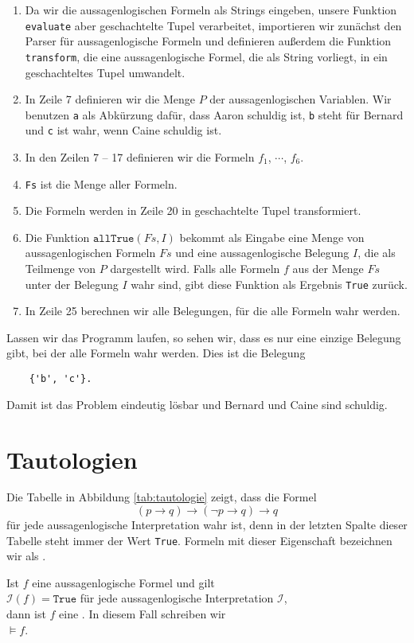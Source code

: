 \begin{enumerate}
\item Da wir die aussagenlogischen Formeln als Strings eingeben, unsere Funktion \texttt{evaluate} aber
      geschachtelte Tupel verarbeitet, importieren wir zunächst den Parser für aussagenlogische Formeln
      und definieren außerdem die Funktion \texttt{transform}, die eine aussagenlogische Formel, die als
      String vorliegt, in ein geschachteltes Tupel umwandelt.
\item In Zeile 7 definieren wir die Menge $P$ der aussagenlogischen Variablen.  Wir benutzen \texttt{a} als
      Abkürzung dafür, dass Aaron schuldig ist, \texttt{b} steht für Bernard und \texttt{c} ist wahr, wenn
      Caine schuldig ist. 
\item In den Zeilen 7 -- 17 definieren wir die Formeln $f_1$, $\cdots$, $f_6$.
\item \texttt{Fs} ist die Menge aller Formeln.
\item Die Formeln werden in Zeile 20 in geschachtelte Tupel transformiert.
\item Die Funktion $\texttt{allTrue}(Fs, I)$ bekommt als Eingabe eine Menge von aussagenlogischen Formeln $Fs$
      und eine aussagenlogische Belegung $I$, die als Teilmenge von $P$ dargestellt wird.  Falls alle Formeln
      $f$ aus der Menge $Fs$ unter der Belegung $I$ wahr sind, gibt diese Funktion als Ergebnis \texttt{True} zurück.
\item In Zeile 25 berechnen wir alle Belegungen, für die alle Formeln wahr werden.
\end{enumerate}
Lassen wir das Programm laufen, so sehen wir, dass es nur eine einzige Belegung gibt, bei der alle Formeln wahr
werden.  Dies ist die Belegung
\begin{verbatim}
    {'b', 'c'}.
\end{verbatim}
Damit ist das Problem eindeutig lösbar und Bernard und Caine sind schuldig.


\section{Tautologien}
Die Tabelle in Abbildung \ref{tab:tautologie} zeigt, dass die Formel
$$  (p \rightarrow q) \rightarrow (\neg p \rightarrow q) \rightarrow q $$
für jede aussagenlogische Interpretation wahr ist, denn in der letzten Spalte dieser Tabelle steht immer der
Wert \texttt{True}.  Formeln mit dieser Eigenschaft  bezeichnen wir als .
\begin{Definition}[Tautologie]
  Ist $f$ eine aussagenlogische Formel und gilt \\[0.2cm]
  \hspace*{1.3cm} $\mathcal{I}(f) = \texttt{True}$ \quad für jede aussagenlogische Interpretation $\mathcal{I}$, \\[0.2cm]
  dann ist $f$ eine .  In diesem Fall schreiben wir \\[0.2cm]
  \hspace*{1.3cm} $\models f$.
  \eox
\end{Definition}

